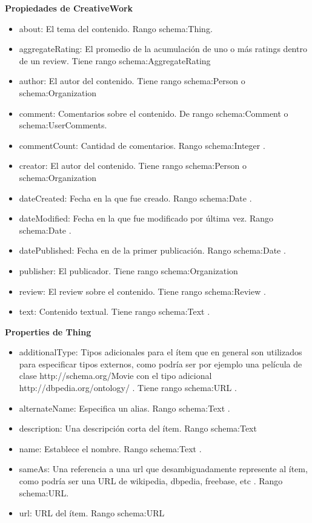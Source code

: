 \noindent \textbf{Propiedades de CreativeWork}\\
 \begin{itemize}
  \item about: El tema del contenido. Rango schema:Thing. 
  \item aggregateRating: El promedio de la acumulación de uno o más ratings dentro de un review. Tiene rango schema:AggregateRating 
  \item author: El autor del contenido. Tiene rango schema:Person o schema:Organization
  \item comment: Comentarios sobre el contenido. De rango schema:Comment o schema:UserComments.
  \item commentCount: Cantidad de comentarios. Rango schema:Integer . 
  \item creator: El autor del contenido. Tiene rango schema:Person o schema:Organization
  \item dateCreated: Fecha en la que fue creado. Rango schema:Date .
  \item dateModified: Fecha en la que fue modificado por última vez. Rango schema:Date .
  \item datePublished: Fecha en de la primer publicación. Rango schema:Date .
  \item publisher: El publicador. Tiene rango schema:Organization
  \item review: El review sobre el contenido. Tiene rango schema:Review .
  \item text: Contenido textual. Tiene rango schema:Text .
 \end{itemize}

\noindent \textbf{Properties de Thing}\\
 \begin{itemize}
  \item additionalType: Tipos adicionales para el ítem que en general son utilizados para especificar tipos externos, como podría ser por ejemplo una película de clase http://schema.org/Movie con el tipo adicional  http://dbpedia.org/ontology/ . Tiene rango schema:URL .
  \item alternateName: Especifica un alias. Rango schema:Text .
  \item description: Una descripción corta del ítem. Rango schema:Text 
  \item name: Establece el nombre. Rango schema:Text .
  \item sameAs: Una referencia a una url que desambiguadamente represente al ítem, como podría ser una URL de wikipedia, dbpedia, freebase, etc . Rango schema:URL.
  \item url: URL del ítem. Rango schema:URL
 \end{itemize}

